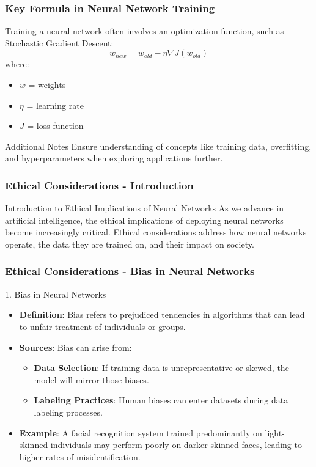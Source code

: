 \documentclass[aspectratio=169]{beamer}
\begin{document}
\begin{frame}[fragile]
    \frametitle{Key Formula in Neural Network Training}

    Training a neural network often involves an optimization function, such as Stochastic Gradient Descent:
    \begin{equation}
        w_{new} = w_{old} - \eta \nabla J(w_{old})
    \end{equation}
    where:
    \begin{itemize}
        \item \( w \) = weights
        \item \( \eta \) = learning rate
        \item \( J \) = loss function
    \end{itemize}
    
    \begin{block}{Additional Notes}
        Ensure understanding of concepts like training data, overfitting, and hyperparameters when exploring applications further.
    \end{block}
\end{frame}

\begin{frame}[fragile]
    \frametitle{Ethical Considerations - Introduction}
    \begin{block}{Introduction to Ethical Implications of Neural Networks}
        As we advance in artificial intelligence, the ethical implications of deploying neural networks become increasingly critical. Ethical considerations address how neural networks operate, the data they are trained on, and their impact on society.
    \end{block}
\end{frame}

\begin{frame}[fragile]
    \frametitle{Ethical Considerations - Bias in Neural Networks}
    \begin{block}{1. Bias in Neural Networks}
        \begin{itemize}
            \item \textbf{Definition}: Bias refers to prejudiced tendencies in algorithms that can lead to unfair treatment of individuals or groups.
            \item \textbf{Sources}: Bias can arise from:
            \begin{itemize}
                \item \textbf{Data Selection}: If training data is unrepresentative or skewed, the model will mirror those biases.
                \item \textbf{Labeling Practices}: Human biases can enter datasets during data labeling processes.
            \end{itemize}
            \item \textbf{Example}: A facial recognition system trained predominantly on light-skinned individuals may perform poorly on darker-skinned faces, leading to higher rates of misidentification.
        \end{itemize}
    \end{block}
\end{frame}
\end{document}
